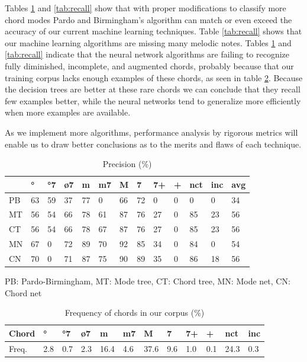 \documentclass{article}
\begin{document}
Tables \ref{tab:precision} and \ref{tab:recall} show that with proper
modifications to classify more chord modes Pardo and Birmingham's
algorithm can match or even exceed the accuracy of our current machine
learning techniques. Table \ref{tab:recall} shows that our machine
learning algorithms are missing many melodic notes. Tables
\ref{tab:precision} and \ref{tab:recall} indicate that the neural
network algorithms are failing to recognize fully diminished,
incomplete, and augmented chords, probably because that our training
corpus lacks enough examples of these chords, as seen in table
\ref{tab:frequency}. Because the decision trees are better at these
rare chords we can conclude that they recall few examples better,
while the neural networks tend to generalize more efficiently when
more examples are available.

As we implement more algorithms, performance analysis by rigorous
metrics will enable us to draw better conclusions as to the merits and
flaws of each technique.


\begin{table}
  \centering
  \begin{tabular}{l|p{.1cm}p{.1cm}p{.1cm}p{.1cm}p{.1cm}p{.1cm}p{.1cm}p{.1cm}p{.01cm}p{.1cm}p{.35cm}|p{.3cm}}
                 &  °& °7& ø7& m&  m7&  M&  7& 7+&+&nct&inc& avg\\
    \hline                                                     
    PB   & 63& 59& 37& 77&  0& 66& 72&  0&0&  0&  0& 34 \\
    MT   & 56& 54& 66& 78& 61& 87& 76& 27&0& 85& 23& 56 \\
    CT   & 56& 54& 66& 78& 67& 87& 76& 27&0& 85& 23& 56 \\
    MN   & 67&  0& 72& 89& 70& 92& 85& 34&0& 84&  0& 54 \\
    CN   & 70&  0& 71& 87& 75& 90& 89& 35&0& 86& 18& 56 \\

  \end{tabular}

\medskip

PB: Pardo-Birmingham, MT: Mode tree, CT: Chord tree, MN: Mode net,
CN: Chord net

  \caption{Precision (\%)}
  \label{tab:precision}
\end{table}

\begin{table}
  \centering
  \begin{tabular}{l|p{.12cm}p{.12cm}p{.12cm}p{.3cm}p{.12cm}p{.3cm}p{.12cm}p{.12cm}p{.12cm}p{.3cm}p{.25cm}}
    Chord        &  °& °7& ø7&   m& m7&   M&  7& 7+&+  & nct&inc \\
    \hline                                                     
    Freq.    &2.8&0.7&2.3&16.4&4.6&37.6&9.6&1.0&0.1&24.3&0.3  \\
  \end{tabular}
  \caption{Frequency of chords in our corpus (\%)}
  \label{tab:frequency}
\end{table}
\end{document}
